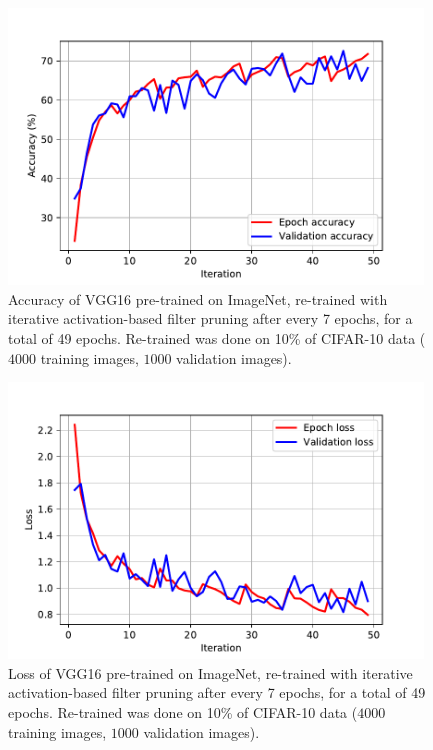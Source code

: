 \documentclass{article}
\begin{document}
\begin{figure}[!t]
	\centering
	\includegraphics[width=11cm]{./results/pPruneActNoNorm5_pre_out_7_in_7_cifar10_10percent_acc.pdf}
	\caption{Accuracy of VGG16 pre-trained on ImageNet, re-trained with iterative activation-based filter pruning after every 7 epochs, for a total of 49 epochs. Re-trained was done on 10\% of CIFAR-10 data ($4000$ training images, $1000$ validation images).}
\end{figure}

\begin{figure}[!t]
	\centering
	\includegraphics[width=11cm]{./results/pPruneActNoNorm5_pre_out_7_in_7_cifar10_10percent_loss.pdf}
	\caption{Loss of VGG16 pre-trained on ImageNet, re-trained with iterative activation-based filter pruning after every 7 epochs, for a total of 49 epochs. Re-trained was done on 10\% of CIFAR-10 data ($4000$ training images, $1000$ validation images).}
\end{figure}
\end{document}
